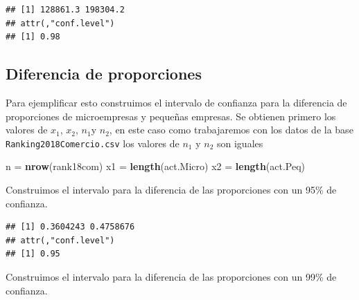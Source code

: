 \documentclass[letterpaper,]{book}
\newenvironment{Shaded}{\begin{snugshade}}{\end{snugshade}}
\newcommand{\DataTypeTok}[1]{\textcolor[rgb]{0.13,0.29,0.53}{#1}}
\newcommand{\FloatTok}[1]{\textcolor[rgb]{0.00,0.00,0.81}{#1}}
\newcommand{\KeywordTok}[1]{\textcolor[rgb]{0.13,0.29,0.53}{\textbf{#1}}}
\newcommand{\NormalTok}[1]{#1}
\newcommand{\OperatorTok}[1]{\textcolor[rgb]{0.81,0.36,0.00}{\textbf{#1}}}
\newcommand{\StringTok}[1]{\textcolor[rgb]{0.31,0.60,0.02}{#1}}
\begin{document}
\begin{verbatim}
## [1] 128861.3 198304.2
## attr(,"conf.level")
## [1] 0.98
\end{verbatim}

\hypertarget{diferencia-de-proporciones}{%
\subsection{Diferencia de proporciones}\label{diferencia-de-proporciones}}

Para ejemplificar esto construimos el intervalo de confianza para la diferencia de proporciones de microempresas y pequeñas empresas. Se obtienen primero los valores de \(x_1\), \(x_2\), \(n_1\)y \(n_2\), en este caso como trabajaremos con los datos de la base \texttt{Ranking2018Comercio.csv} los valores de \(n_1\) y \(n_2\) son iguales

\begin{Shaded}
\begin{Highlighting}[]
\NormalTok{n =}\StringTok{ }\KeywordTok{nrow}\NormalTok{(rank18com)}
\NormalTok{x1 =}\StringTok{ }\KeywordTok{length}\NormalTok{(act.Micro)}
\NormalTok{x2 =}\StringTok{ }\KeywordTok{length}\NormalTok{(act.Peq)}
\end{Highlighting}
\end{Shaded}

Construimos el intervalo para la diferencia de las proporciones con un 95\% de confianza.

\begin{Shaded}
\end{Shaded}

\begin{verbatim}
## [1] 0.3604243 0.4758676
## attr(,"conf.level")
## [1] 0.95
\end{verbatim}

Construimos el intervalo para la diferencia de las proporciones con un 99\% de confianza.

\begin{Shaded}
\end{Shaded}
\end{document}
